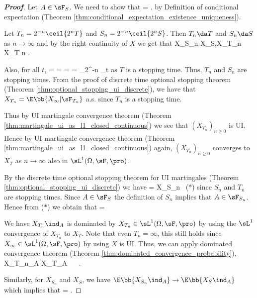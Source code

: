 \begin{proof}[\bf Proof]
Let $A \in \sF_S$. We need to show that
\be
\E{} = \E{}.
\ee
by Definition of conditional expectation (Theorem \ref{thm:conditional_expectation_existence_uniqueness}).

Let $T_n = 2^{-n}\ceil{2^nT}$ and $S_n = 2^{-n}\ceil{2^nS}$. Then $T_n \da T$ and $S_n \da S$ as $n \to \infty$ and by the right continuity of $X$ we get that
\be
X_{S_n} \to X_S,\quad X_{T_n} \to X_T \quad{}n \to\infty.
\ee

Also, for all $t$,
\be
{} =  =  =  =  \in \sF_{2^{-n}} \subseteq \sF_t
\ee
as $T$ is a stopping time. Thus, $T_n$ and $S_n$ are stopping times. From the proof of discrete time optional stopping theorem (Theorem \ref{thm:optional_stopping_ui_discrete}), we have that $X_{T_n} = \E\bb{X_\infty |\sF_{T_n}}$ a.s. since $T_n$ is a stopping time.

Thus by UI martingale convergence theorem (Theorem \ref{thm:martingale_ui_as_l1_closed_continuous}) we see that $(X_{T_n})_{n\geq 0}$ is UI. Hence by UI martingale convergence theorem (Theorem \ref{thm:martingale_ui_as_l1_closed_continuous}) again, $(X_{T_n})_{n\geq 0}$ converges to $X_T$ as $n \to \infty$ also in $\sL^1(\Omega,\sF,\pro)$.

By the discrete time optional stopping theorem for UI martingales (Theorem \ref{thm:optional_stopping_ui_discrete}) we have
\be
\E{} = X_{S_n}\  \quad \quad (*)
\ee
since $S_n$ and $T_n$ are stopping times. Since $A \in \sF_S$ the definition of $S_n$ implies that $A \in \sF_{S_n}$. Hence from ($*$) we obtain that
\be
\E{} = \E{}
\ee

We have $X_{T_n}\ind_A$ is dominated by $X_{T_n} \in \sL^1(\Omega,\sF,\pro)$ by using the $\sL^1$ convergence of $X_{T_n}$ to $X_T$. Note that even $T_n = \infty$, this still holds since $X_\infty \in \sL^1(\Omega,\sF,\pro)$ by using $X$ is UI. Thus, we can apply dominated convergence theorem (Theorem \ref{thm:dominated_convergence_probability}),
\be
X_{T_n}\ind_A \to X_T\ind_A \ \ra \ \E{} \to \E{}.
\ee

Similarly, for $X_{S_n}$ and $X_S$, we have $\E\bb{X_{S_n}\ind_A} \to \E\bb{X_S\ind_A}$ which implies that
\be
\E{} = \E{}.
\ee
\end{proof}


